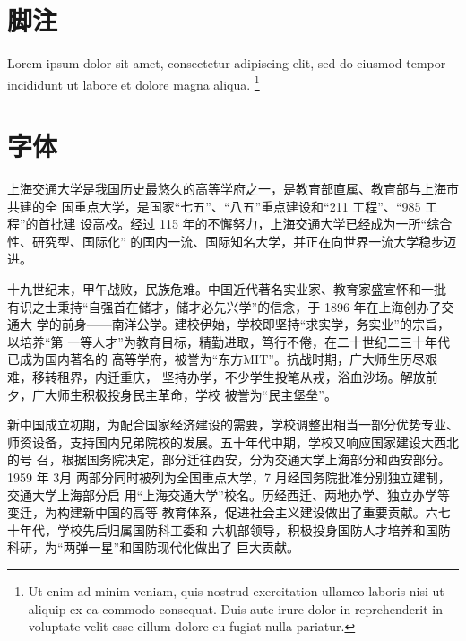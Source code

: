 \section{脚注}

Lorem ipsum dolor sit amet, consectetur adipiscing elit, sed do eiusmod tempor
incididunt ut labore et dolore magna aliqua. \footnote{Ut enim ad minim veniam,
quis nostrud exercitation ullamco laboris nisi ut aliquip ex ea commodo
consequat. Duis aute irure dolor in reprehenderit in voluptate velit esse cillum
dolore eu fugiat nulla pariatur.}

\section{字体}


上海交通大学是我国历史最悠久的高等学府之一，是教育部直属、教育部与上海市共建的全
国重点大学，是国家“七五”、“八五”重点建设和“211 工程”、“985 工程”的首批建
设高校。经过 115 年的不懈努力，上海交通大学已经成为一所“综合性、研究型、国际化”
的国内一流、国际知名大学，并正在向世界一流大学稳步迈进。 

{\songti 十九世纪末，甲午战败，民族危难。中国近代著名实业家、教育家盛宣怀和一批
  有识之士秉持“自强首在储才，储才必先兴学”的信念，于 1896 年在上海创办了交通大
  学的前身——南洋公学。建校伊始，学校即坚持“求实学，务实业”的宗旨，以培养“第
  一等人才”为教育目标，精勤进取，笃行不倦，在二十世纪二三十年代已成为国内著名的
  高等学府，被誉为“东方MIT”。抗战时期，广大师生历尽艰难，移转租界，内迁重庆，
  坚持办学，不少学生投笔从戎，浴血沙场。解放前夕，广大师生积极投身民主革命，学校
  被誉为“民主堡垒”。}

{\heiti 新中国成立初期，为配合国家经济建设的需要，学校调整出相当一部分优势专业、
  师资设备，支持国内兄弟院校的发展。五十年代中期，学校又响应国家建设大西北的号
  召，根据国务院决定，部分迁往西安，分为交通大学上海部分和西安部分。1959 年 3月
  两部分同时被列为全国重点大学，7 月经国务院批准分别独立建制，交通大学上海部分启
  用“上海交通大学”校名。历经西迁、两地办学、独立办学等变迁，为构建新中国的高等
  教育体系，促进社会主义建设做出了重要贡献。六七十年代，学校先后归属国防科工委和
  六机部领导，积极投身国防人才培养和国防科研，为“两弹一星”和国防现代化做出了
  巨大贡献。}

